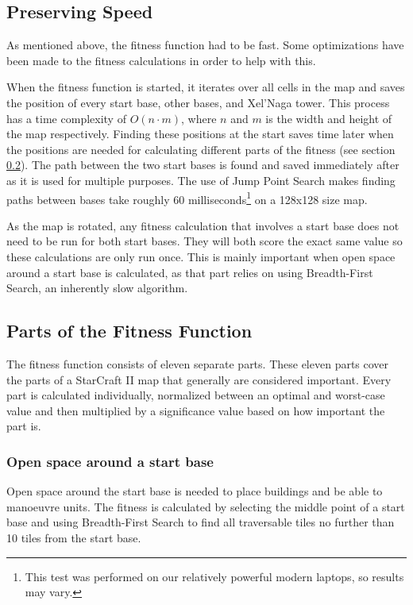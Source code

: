 \subsection{Preserving Speed}
\label{methodology_mapfitness_speed}

As mentioned above, the fitness function had to be fast. Some optimizations have been made to the fitness calculations in order to help with this.

When the fitness function is started, it iterates over all cells in the map and saves the position of every start base, other bases, and Xel'Naga tower. This process has a time complexity of $O(n\cdot m)$, where $n$ and $m$ is the width and height of the map respectively. Finding these positions at the start saves time later when the positions are needed for calculating different parts of the fitness (see section \ref{methodology_mapfitness_parts}). The path between the two start bases is found and saved immediately after as it is used for multiple purposes. The use of Jump Point Search makes finding paths between bases take roughly 60 milliseconds\footnote{This test was performed on our relatively powerful modern laptops, so results may vary.} on a 128x128 size map.

As the map is rotated, any fitness calculation that involves a start base does not need to be run for both start bases. They will both score the exact same value so these calculations are only run once. This is mainly important when open space around a start base is calculated, as that part relies on using Breadth-First Search, an inherently slow algorithm.

\subsection{Parts of the Fitness Function}
\label{methodology_mapfitness_parts}

The fitness function consists of eleven separate parts. These eleven parts cover the parts of a StarCraft II map that generally are considered important. Every part is calculated individually, normalized between an optimal and worst-case value and then multiplied by a significance value based on how important the part is.

	\subsubsection*{Open space around a start base} 
	Open space around the start base is needed to place buildings and be able to manoeuvre units. The fitness is calculated by selecting the middle point of a start base and using Breadth-First Search to find all traversable tiles no further than 10 tiles from the start base.

